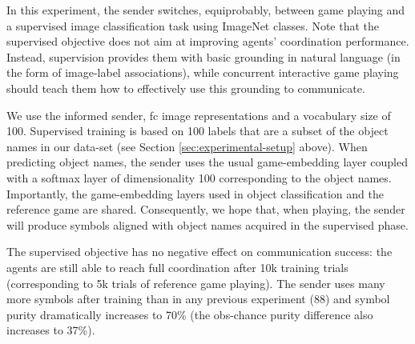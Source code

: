 In this experiment, the sender switches,
equiprobably, between game playing and a supervised image
classification task using ImageNet classes. %
Note that the supervised objective does not aim at improving agents'
coordination performance. Instead, supervision provides them with basic
grounding in natural language (in the form of image-label
associations), while concurrent interactive game playing should teach
them how to effectively use this grounding to communicate.

We use the informed sender, fc image representations and a vocabulary size of 100. Supervised training is
based on 100 labels that are a subset of the object names in our
data-set (see Section \ref{sec:experimental-setup} above). When
predicting object names, the sender  uses the usual game-embedding layer 
coupled with a softmax layer of dimensionality 100 corresponding to
the object names. Importantly, the game-embedding layers used in
object classification and the reference game are shared. Consequently,
we hope that, when playing, the sender will produce symbols aligned with object names acquired in the
supervised phase. %


The supervised objective has no negative effect on
communication success: the agents are still able to reach full
coordination after 10k training trials (corresponding to 5k trials of reference game playing). The sender uses 
many more symbols after training than in any previous experiment
(88) and symbol purity dramatically increases to 70\% (the
obs-chance purity difference also increases to 37\%). 

